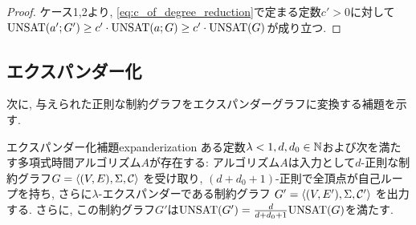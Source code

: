\begin{proof}
ケース1,2より, \cref{eq:c_of_degree_reduction}で定まる定数$c'>0$に対して$\mathrm{UNSAT}(a';G') \ge c'\cdot \mathrm{UNSAT}(a;G) \ge c'\cdot \mathrm{UNSAT}(G)$が成り立つ.
\end{proof}

\subsection{エクスパンダー化}

次に, 与えられた正則な制約グラフをエクスパンダーグラフに変換する補題を示す.

\begin{lemma}{エクスパンダー化補題}{expanderization}
ある定数$\lambda<1,d,d_0\in\mathbb{N}$および次を満たす多項式時間アルゴリズム$A$が存在する:
アルゴリズム$A$は入力として$d$-正則な制約グラフ$G = \langle (V,E), \Sigma, \mathcal{C} \rangle$
を受け取り, $(d+d_0+1)$-正則で全頂点が自己ループを持ち, さらに$\lambda$-エクスパンダーである制約グラフ $G' = \langle (V, E'), \Sigma, \mathcal{C}' \rangle$ を出力する.
さらに, この制約グラフ$G'$は$\mathrm{UNSAT}(G') = \frac{d}{d+d_0+1}\mathrm{UNSAT}(G)$を満たす.
\end{lemma}

